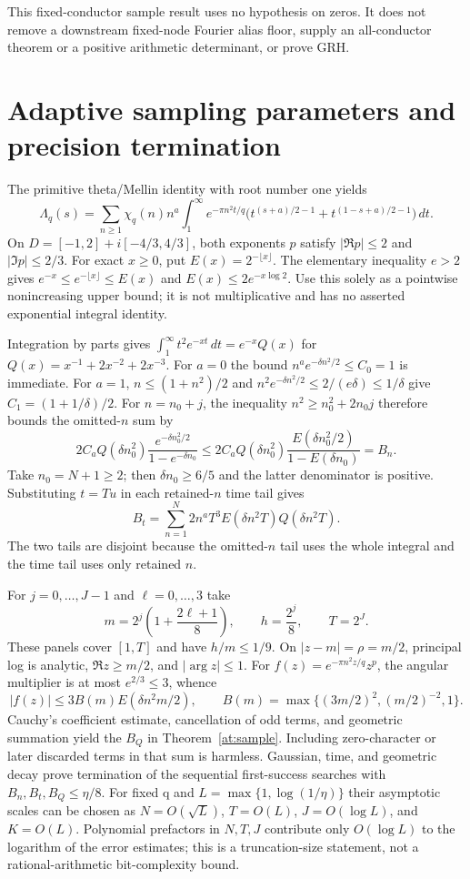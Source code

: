 \documentclass[11pt]{article}
\theoremstyle{definition}\newtheorem{definition}[theorem]{Definition}
\theoremstyle{remark}\newtheorem{remark}[theorem]{Remark}
\begin{document}
This fixed-conductor sample result uses no hypothesis on zeros.
It does not remove a downstream fixed-node Fourier alias floor, supply
an all-conductor theorem or a positive arithmetic determinant, or prove GRH.

\section{Adaptive sampling parameters and precision termination}\label{at:details}
The primitive theta/Mellin identity with root number one yields
\[
 \Lambda_q(s)=\sum_{n\ge1}\chi_q(n)n^a
 \int_1^\infty e^{-\pi n^2t/q}
 \bigl(t^{(s+a)/2-1}+t^{(1-s+a)/2-1}\bigr)\,dt.
\]
On $D=[-1,2]+i[-4/3,4/3]$, both exponents $p$ satisfy
$|\Re p|\le2$ and $|\Im p|\le2/3$.
For exact $x\ge0$, put $E(x)=2^{-\lfloor x\rfloor}$.
The elementary inequality $e>2$ gives
$e^{-x}\le e^{-\lfloor x\rfloor}\le E(x)$ and
$E(x)\le2e^{-x\log2}$.
Use this solely as a pointwise nonincreasing upper bound; it is not
multiplicative and has no asserted exponential integral identity.

Integration by parts gives
$\int_1^\infty t^2e^{-xt}\,dt=e^{-x}Q(x)$ for
$Q(x)=x^{-1}+2x^{-2}+2x^{-3}$.
For $a=0$ the bound $n^ae^{-\delta n^2/2}\le C_0=1$ is immediate.
For $a=1$, $n\le(1+n^2)/2$ and
$n^2e^{-\delta n^2/2}\le2/(e\delta)\le1/\delta$ give
$C_1=(1+1/\delta)/2$.
For $n=n_0+j$, the inequality
$n^2\ge n_0^2+2n_0j$ therefore bounds the omitted-$n$ sum by
\[
 2C_aQ(\delta n_0^2)
 \frac{e^{-\delta n_0^2/2}}{1-e^{-\delta n_0}}
 \le2C_aQ(\delta n_0^2)
 \frac{E(\delta n_0^2/2)}{1-E(\delta n_0)}=B_n.
\]
Take $n_0=N+1\ge2$; then $\delta n_0\ge6/5$ and the latter denominator
is positive. Substituting $t=Tu$ in each retained-$n$ time tail gives
\[
 B_t=\sum_{n=1}^N2n^aT^3E(\delta n^2T)Q(\delta n^2T).
\]
The two tails are disjoint because the omitted-$n$ tail uses the whole
integral and the time tail uses only retained $n$.

For $j=0,\ldots,J-1$ and $\ell=0,\ldots,3$ take
\[
 m=2^j\left(1+\frac{2\ell+1}{8}\right),\qquad h=\frac{2^j}{8},
 \qquad T=2^J.
\]
These panels cover $[1,T]$ and have $h/m\le1/9$.
On $|z-m|=\rho=m/2$, principal log is analytic,
$\Re z\ge m/2$, and $|\arg z|\le1$.
For $f(z)=e^{-\pi n^2z/q}z^p$, the angular multiplier is at most
$e^{2/3}\le3$, whence
\[
 |f(z)|\le3B(m)E(\delta n^2m/2),\qquad
 B(m)=\max\{(3m/2)^2,(m/2)^{-2},1\}.
\]
Cauchy's coefficient estimate, cancellation of odd terms, and geometric
summation yield the $B_Q$ in Theorem~\ref{at:sample}.
Including zero-character or later discarded terms in that sum is harmless.
Gaussian, time, and geometric decay prove termination of the sequential
first-success searches with $B_n,B_t,B_Q\le\eta/8$.
For fixed q and $L=\max\{1,\log(1/\eta)\}$ their asymptotic scales can be
chosen as $N=O(\sqrt L)$, $T=O(L)$, $J=O(\log L)$, and $K=O(L)$.
Polynomial prefactors in $N,T,J$ contribute only $O(\log L)$ to the
logarithm of the error estimates; this is a truncation-size statement,
not a rational-arithmetic bit-complexity bound.
\end{document}
